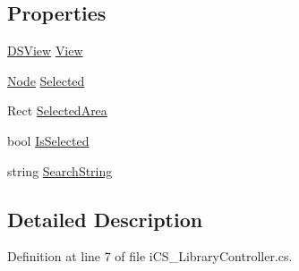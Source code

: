 \subsection*{Properties}
\begin{DoxyCompactItemize}
\item 
\hyperlink{class_d_s_view}{D\+S\+View} \hyperlink{classi_c_s___library_controller_a103a623d9e1b67daf4a6b66aaa828481}{View}
\item 
\hyperlink{classi_c_s___library_controller_1_1_node}{Node} \hyperlink{classi_c_s___library_controller_af9d1e98537cbae57970093edf9279a53}{Selected}
\item 
Rect \hyperlink{classi_c_s___library_controller_ae2655750612741482b895fca22a19a76}{Selected\+Area}
\item 
bool \hyperlink{classi_c_s___library_controller_aeac8c5edc2ef0179df3a97d8a7fe7e38}{Is\+Selected}
\item 
string \hyperlink{classi_c_s___library_controller_a76133d9732f40a639efdbe59d50f29a9}{Search\+String}
\end{DoxyCompactItemize}


\subsection{Detailed Description}


Definition at line 7 of file i\+C\+S\+\_\+\+Library\+Controller.\+cs.



